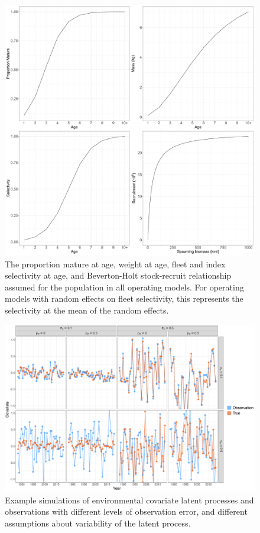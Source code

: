 \documentclass[
  12pt,
]{article}
\begin{document}
\begin{figure}
\begin{center}
\includegraphics[width = \textwidth]{om_input_plots_figure}
\end{center}
\caption{The proportion mature at age, weight at age, fleet and index selectivity at age, and Beverton-Holt stock-recruit relationship assumed for the population in all operating models. For operating models with random effects on fleet selectivity, this represents the selectivity at the mean of the random effects.}\label{om_inputs_fig}
\end{figure}

\begin{landscape}
\begin{figure}
\caption{Example simulations of environmental covariate latent processes and observations with different levels of observation error, and different assumptions about variability of the latent process.}\label{om_ecov_example}
\begin{center}
\includegraphics[height = \textheight]{Ecov_true_obs_example}
\end{center}
\end{figure}
\end{landscape}
\end{document}
